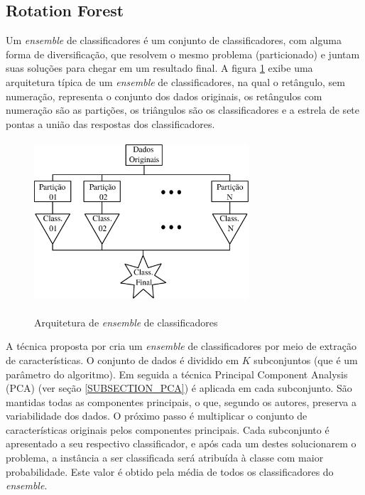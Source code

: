 \subsection{Rotation Forest}
Um \emph{ensemble} de classificadores é um conjunto de classificadores, com alguma forma de diversificação, que resolvem o mesmo problema (particionado) e juntam suas soluções para chegar em um resultado final. A figura \ref{FIGURA_ENSEMBLE_DE_CLASSIFICADORES} exibe uma arquitetura típica de um \emph{ensemble} de classificadores, na qual o retângulo, sem numeração, representa o conjunto dos dados originais, os retângulos com numeração são as partições, os triângulos são os classificadores e a estrela de sete pontas a união das respostas dos classificadores.
\begin{figure}[hbt]
  \centering
  \caption{Arquitetura de \emph{ensemble} de classificadores}
  	\includegraphics[width=8cm,height=6cm]{./secoes/conceitosFundamentais/pics/img/Ensemble.eps}
  \label{FIGURA_ENSEMBLE_DE_CLASSIFICADORES}
  \vspace{0.1cm}
\end{figure}

A técnica proposta por  cria um \emph{ensemble} de classificadores por meio de extração de características. O conjunto de dados é dividido em \(K\) subconjuntos (que é um parâmetro do algoritmo). Em seguida a técnica Principal Component Analysis (PCA) (ver seção \ref{SUBSECTION_PCA}) é aplicada em cada subconjunto. São mantidas todas as componentes principais, o que, segundo os autores, preserva a variabilidade dos dados. O próximo passo é multiplicar o conjunto de características originais pelos componentes principais.  Cada subconjunto é apresentado a seu respectivo classificador, e após cada um destes solucionarem o problema, a instância a ser classificada será atribuída à classe com maior probabilidade. Este valor é obtido pela média de todos os classificadores do \emph{ensemble}.

